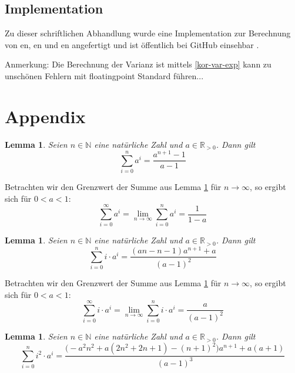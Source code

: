 \documentclass[a4paper]{article}
\newtheorem{lemma}[satz]{Lemma}
\theoremstyle{nonumberplain}
\begin{document}
\subsection{Implementation}

Zu dieser schriftlichen Abhandlung wurde eine Implementation zur Berechnung von \expect{}en, \var{}en und \cov{}en angefertigt und ist öffentlich bei GitHub einsehbar \cite{MCA}. 





\begin{meta}
Anmerkung: Die Berechnung der Varianz ist mittels \ref{kor-var-exp} kann zu unschönen Fehlern mit floatingpoint Standard führen...
\end{meta}


\section{Appendix}
\begin{lemma} \label{lem-geosum}
	Seien $n \in \mathbb{N}$ eine natürliche Zahl und $a \in \mathbb{R}_{>0}$. Dann gilt
\begin{equation}
\sum_{i=0}^{n}{a^i} = \frac{a^{n+1}-1}{a-1}
\end{equation}
\end{lemma}

Betrachten wir den Grenzwert der Summe aus Lemma \ref{lem-geosum} für $n \to \infty$, so ergibt sich für $0<a<1$:
\begin{equation}
\sum_{i=0}^{\infty}{a^i}
= \lim\limits_{n \to \infty} \sum_{i=0}^{n}{a^i}
= \frac{1}{1-a}
\end{equation}

\begin{lemma} \label{lem-infsum}
	Seien $n \in \mathbb{N}$ eine natürliche Zahl und $a \in \mathbb{R}_{>0}$. Dann gilt
	\begin{equation}
		\sum_{i=0}^{n}{i\cdot a^i} = \frac{(an-n-1)a^{n+1}+a}{(a-1)^2}
	\end{equation}
\end{lemma}

Betrachten wir den Grenzwert der Summe aus Lemma \ref{lem-infsum} für $n \to \infty$, so ergibt sich für $0<a<1$:
\begin{equation}
\sum_{i=0}^{\infty}{i\cdot a^i}
= \lim\limits_{n \to \infty} \sum_{i=0}^{n}{i\cdot a^i}
= \frac{a}{(a-1)^2}
\end{equation}

\begin{lemma} \label{lem-infqsum}
	Seien $n \in \mathbb{N}$ eine natürliche Zahl und $a \in \mathbb{R}_{>0}$. Dann gilt
	\begin{equation}
	\sum_{i=0}^{n}{i^2\cdot a^i} = \frac{\big(-a^2n^2 + a(2n^2 + 2n + 1) - (n+1)^2\big)a^{n+1}+a(a+1)}{(a-1)^3}
	\end{equation}
\end{lemma}


\printbibliography
\end{document}
